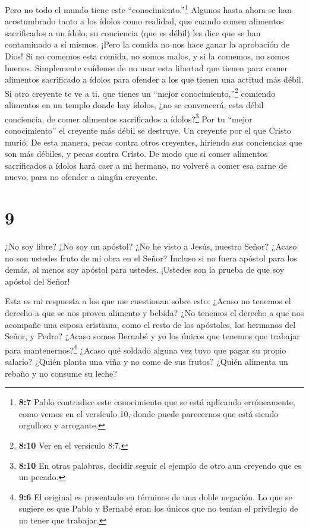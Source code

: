  Pero no todo el mundo tiene este
``conocimiento.''\footnote{\textbf{8:7} Pablo contradice este
  conocimiento que se está aplicando erróneamente, como vemos en el
  versículo 10, donde puede parecernos que está siendo orgulloso y
  arrogante.} Algunos hasta ahora se han acostumbrado tanto a los ídolos
como realidad, que cuando comen alimentos sacrificados a un ídolo, su
conciencia (que es débil) les dice que se han contaminado a sí mismos.
 ¡Pero la comida no nos hace ganar la aprobación de Dios! Si
no comemos esta comida, no somos malos, y si la comemos, no somos
buenos.  Simplemente cuídense de no usar esta libertad que
tienen para comer alimentos sacrificado a ídolos para ofender a los que
tienen una actitud más débil.  Si otro creyente te ve a ti,
que tienes un ``mejor conocimiento,''\footnote{\textbf{8:10} Ver en el
  versículo 8:7.} comiendo alimentos en un templo donde hay ídolos, ¿no
se convencerá, esta débil conciencia, de comer alimentos sacrificados a
ídolos?\footnote{\textbf{8:10} En otras palabras, decidir seguir el
  ejemplo de otro aun creyendo que es un pecado.}  Por tu
``mejor conocimiento'' el creyente más débil se destruye. Un creyente
por el que Cristo murió.  De esta manera, pecas contra
otros creyentes, hiriendo sus conciencias que son más débiles, y pecas
contra Cristo.  De modo que si comer alimentos sacrificados
a ídolos hará caer a mi hermano, no volveré a comer esa carne de nuevo,
para no ofender a ningún creyente.

\hypertarget{section-8}{%
\section{9}\label{section-8}}

 ¿No soy libre? ¿No soy un apóstol? ¿No he visto a Jesús,
nuestro Señor? ¿Acaso no son ustedes fruto de mi obra en el Señor?
 Incluso si no fuera apóstol para los demás, al menos soy
apóstol para ustedes. ¡Ustedes son la prueba de que soy apóstol del
Señor!

 Esta es mi respuesta a los que me cuestionan sobre esto:
 ¿Acaso no tenemos el derecho a que se nos provea alimento y
bebida?  ¿No tenemos el derecho a que nos acompañe una
esposa cristiana, como el resto de los apóstoles, los hermanos del
Señor, y Pedro?  ¿Acaso somos Bernabé y yo los únicos que
tenemos que trabajar para mantenernos?\footnote{\textbf{9:6} El original
  es presentado en términos de una doble negación. Lo que se sugiere es
  que Pablo y Bernabé eran los únicos que no tenían el privilegio de no
  tener que trabajar.}  ¿Acaso qué soldado alguna vez tuvo
que pagar su propio salario? ¿Quién planta una viña y no come de sus
frutos? ¿Quién alimenta un rebaño y no consume su leche?

